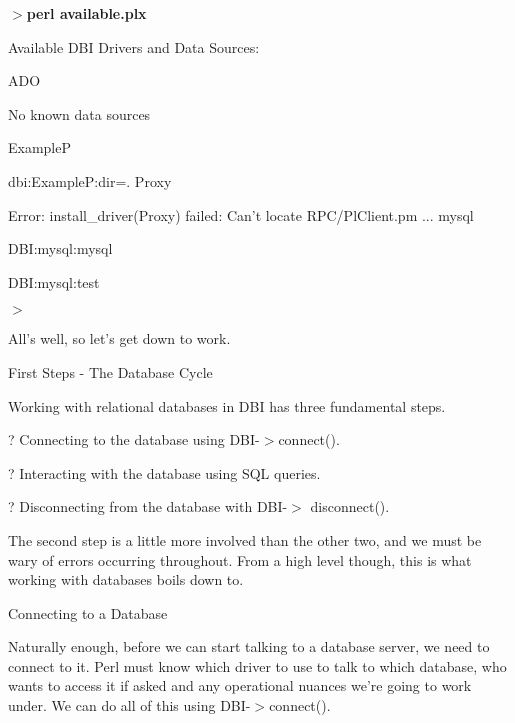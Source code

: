 \documentclass[a4paper,11pt]{book}
\begin{document}
\noindent 

\noindent $>$\textbf{perl available.plx}

\noindent Available DBI Drivers and Data Sources:

\noindent 

\noindent ADO

\noindent 

\noindent 

\noindent No known data sources

\noindent ExampleP

dbi:ExampleP:dir=. Proxy

Error: install\_driver(Proxy) failed: Can't locate RPC/PlClient.pm ... mysql

\noindent DBI:mysql:mysql

\noindent DBI:mysql:test

\noindent $>$

\noindent 

\noindent All's well, so let's get down to work.

\noindent 

\noindent 

\noindent First Steps - The Database Cycle

\noindent 

\noindent Working with relational databases in DBI has three fundamental steps.

\noindent 

\noindent ? Connecting to the database using DBI-$>$connect().

\noindent 

\noindent ? Interacting with the database using SQL queries.

\noindent 

\noindent ? Disconnecting from the database with DBI-$>$ disconnect().

\noindent 

\noindent The second step is a little more involved than the other two, and we must be wary of errors occurring throughout. From a high level though, this is what working with databases boils down to.

\noindent 

\noindent Connecting to a Database

\noindent 

\noindent Naturally enough, before we can start talking to a database server, we need to connect to it. Perl must know which driver to use to talk to which database, who wants to access it if asked and any operational nuances we're going to work under. We can do all of this using DBI-$>$connect().
\end{document}
